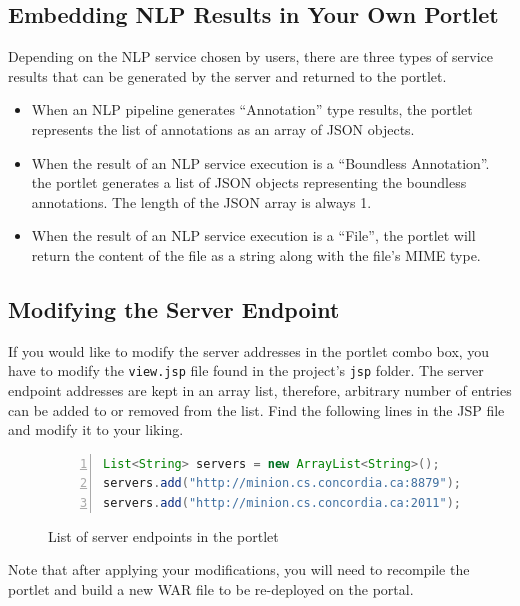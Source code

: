 \subsection{Embedding NLP Results in Your Own Portlet}
Depending on the NLP service chosen by users, there are three types of service results that can be generated by the \sa server and returned to the portlet.

\begin{itemize}
\item When an NLP pipeline generates ``Annotation'' type results, the \sa portlet represents the list of annotations as an array of JSON objects.
\item When the result of an NLP service execution is a ``Boundless Annotation''. the \sa portlet generates a list of JSON objects representing the boundless annotations. The length of the JSON array is always 1.
\item When the result of an NLP service execution is a ``File'', the \sa portlet will return the content of the file as a string along with the file's MIME type.
\end{itemize}

\subsection{Modifying the \sa Server Endpoint}
If you would like to modify the \sa server addresses in the portlet combo box, you have to modify the \texttt{view.jsp} file found in the project's \texttt{jsp} folder. The server endpoint addresses are kept in an array list, therefore, arbitrary number of entries can be added to or removed from the list. Find the following lines in the JSP file and modify it to your liking.

\begin{figure}[h!]
\centering
\begin{lstlisting}[language=Java,numbers=left,xleftmargin=4mm,columns=flexible]
List<String> servers = new ArrayList<String>();
servers.add("http://minion.cs.concordia.ca:8879");
servers.add("http://minion.cs.concordia.ca:2011");
\end{lstlisting}
\caption{List of \sa server endpoints in the portlet}
\label{list:portal_server_addresses}
\end{figure}

Note that after applying your modifications, you will need to recompile the portlet and build a new WAR file to be re-deployed on the portal.

\label{sec:server_change}